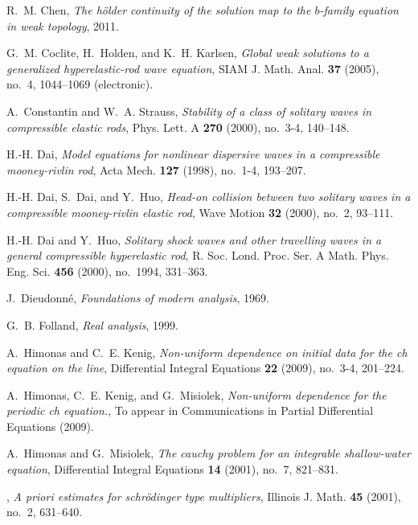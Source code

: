 \documentclass[final]{nddiss2e}
\begin{document}
\begin{thebibliography}{HKM09}
R.~M. Chen, \emph{The h{\"o}lder continuity of the solution map to the
  $b$-family equation in weak topology}, 2011.

G.~M. Coclite, H.~Holden, and K.~H. Karlsen, \emph{Global weak solutions to a
  generalized hyperelastic-rod wave equation}, SIAM J. Math. Anal. \textbf{37}
  (2005), no.~4, 1044--1069 (electronic).

A.~Constantin and W.~A. Strauss, \emph{Stability of a class of solitary waves
  in compressible elastic rods}, Phys. Lett. A \textbf{270} (2000), no.~3-4,
  140--148.

H.-H. Dai, \emph{Model equations for nonlinear dispersive waves in a
  compressible mooney-rivlin rod}, Acta Mech. \textbf{127} (1998), no.~1-4,
  193--207.

H.-H. Dai, S.~Dai, and Y.~Huo, \emph{Head-on collision between two solitary
  waves in a compressible mooney-rivlin elastic rod}, Wave Motion \textbf{32}
  (2000), no.~2, 93--111.

H.-H. Dai and Y.~Huo, \emph{Solitary shock waves and other travelling waves in
  a general compressible hyperelastic rod}, R. Soc. Lond. Proc. Ser. A Math.
  Phys. Eng. Sci. \textbf{456} (2000), no.~1994, 331--363.

J.~Dieudonn{\'e}, \emph{Foundations of modern analysis}, 1969.

G.~B. Folland, \emph{Real analysis}, 1999.

A.~Himonas and C.~E. Kenig, \emph{Non-uniform dependence on initial data for
  the ch equation on the line}, Differential Integral Equations \textbf{22}
  (2009), no.~3-4, 201--224.

A.~Himonas, C.~E. Kenig, and G.~Misiolek, \emph{Non-uniform dependence for the
  periodic ch equation.}, To appear in Communications in Partial Differential
  Equations (2009).

A.~Himonas and G.~Misiolek, \emph{The cauchy problem for an integrable
  shallow-water equation}, Differential Integral Equations \textbf{14} (2001),
  no.~7, 821--831.

\bysame, \emph{A priori estimates for schr{\"o}dinger type multipliers},
  Illinois J. Math. \textbf{45} (2001), no.~2, 631--640.


\end{thebibliography}
\end{document}
